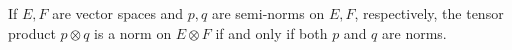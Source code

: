 If $E, F$ are vector spaces and $p, q$ are semi-norms on $E, F$, respectively, the tensor product $p \otimes q$ is a norm on $E \otimes F$ if and only if both $p$ and $q$ are norms.
